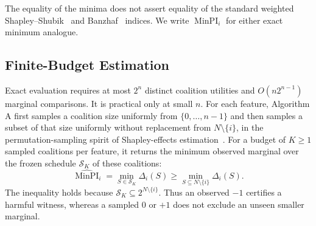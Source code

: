 \documentclass{article}
\begin{document}
The equality of the minima does not assert equality of the standard weighted Shapley--Shubik~\citep{shapley1954method} and Banzhaf~\citep{banzhaf1965weighted} indices. We write $\operatorname{MinPI}_i$ for either exact minimum analogue.

\subsection{Finite-Budget Estimation}

Exact evaluation requires at most $2^n$ distinct coalition utilities and $O(n2^{n-1})$ marginal comparisons. It is practical only at small $n$. For each feature, Algorithm A first samples a coalition size uniformly from $\{0,\ldots,n-1\}$ and then samples a subset of that size uniformly without replacement from $N\setminus\{i\}$, in the permutation-sampling spirit of Shapley-effects estimation~\citep{song2016shapley}. For a budget of $K\geq1$ sampled coalitions per feature, it returns the minimum observed marginal over the frozen schedule $\mathcal{S}_K$ of these coalitions:
\begin{equation}
\widehat{\operatorname{MinPI}}_i
=\min_{S\in\mathcal{S}_K}\Delta_i(S)
\geq \min_{S\subseteq N\setminus\{i\}}\Delta_i(S).
\label{eq:sample-min}
\end{equation}
The inequality holds because $\mathcal{S}_K\subseteq 2^{N\setminus\{i\}}$. Thus an observed $-1$ certifies a harmful witness, whereas a sampled $0$ or $+1$ does not exclude an unseen smaller marginal.
\end{document}
